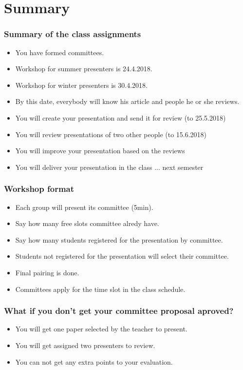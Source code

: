 \section{Summary}
\begin{frame}
\frametitle{Summary of the class assignments}
\begin{itemize}
\item You have formed committees.
\item Workshop for summer presenters is 24.4.2018.
\item Workshop for winter presenters is 30.4.2018.
\item By this date, everybody will know his article and people he or she reviews.
\item You will create your presentation and send it for review (to 25.5.2018)
\item You will review presentations of two other people (to 15.6.2018)
\item You will improve your presentation based on the reviews
\item You will deliver your presentation in the class ... next semester
\end{itemize}
\end{frame}

\begin{frame}
\frametitle{Workshop format}
\begin{itemize}
\item Each group will present its committee (5min).
\item Say how many free slots committee alredy have.
\item Say how many students registered for the presentation by committee.
\item Students not registered for the presentation will select their committee.
\item Final pairing is done.
\item Committees apply for the time slot in the class schedule.
\end{itemize}
\end{frame}


\begin{frame}
\frametitle{What if you don't get your committee proposal aproved?}
\begin{itemize}
\item You will get one paper selected by the teacher to present.
\item You will get assigned two presenters to review.
\item You can not get any extra points to your evaluation.
\end{itemize}
\end{frame}

